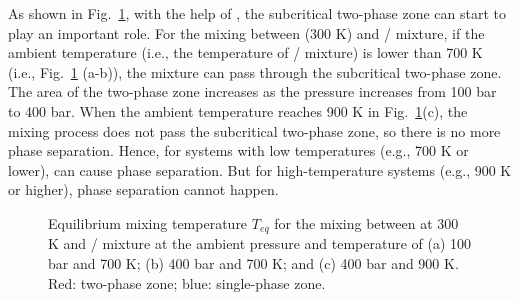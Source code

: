 As shown in Fig.~\ref{v8}, with the help of , the subcritical two-phase zone can start to play an important role. %
For the mixing between  (300 K) and / mixture, if the ambient temperature (i.e., the temperature of / mixture) is lower than 700 K (i.e., Fig.~\ref{v8} (a-b)), the mixture can pass through the subcritical two-phase zone. The area of the two-phase zone increases as the pressure increases from 100 bar to 400 bar. When the ambient temperature reaches 900 K in Fig.~\ref{v8}(c), the mixing process does not pass the subcritical two-phase zone, so there is no more phase separation. Hence, for  systems with low temperatures (e.g., 700 K or lower),  can cause phase separation. But for high-temperature  systems (e.g., 900 K or higher), phase separation cannot happen.  %
\begin{figure}[htb]
    \centering

    \caption{Equilibrium mixing temperature $T_{eq}$ for the mixing between  at 300 K and / mixture at the ambient pressure and temperature of (a) 100 bar and 700 K; (b) 400 bar and 700 K; and (c) 400 bar and 900 K. Red: two-phase zone; blue: single-phase zone.}
    \label{v8}
\end{figure}


